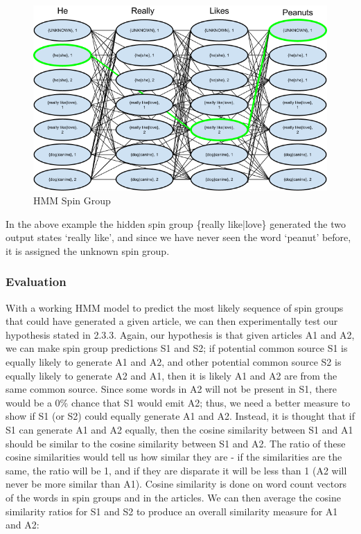 \documentclass[11pt,letterpaper,oneside, titlepage]{scrartcl}
\begin{document}
\begin{figure}[h!]
  \centering
  \includegraphics[width=1\textwidth]{hmm_spin_group}
  \caption{HMM Spin Group}
  \label{fig:hmm_spin_group}
\end{figure}

\clearpage

In the above example the hidden spin group \{really like|love\} generated the two output states ‘really like’, and since we have never seen the word ‘peanut’ before, it is assigned the unknown spin group.

\subsubsection{Evaluation}

With a working HMM model to predict the most likely sequence of spin groups that could have generated a given article, we can then experimentally test our hypothesis stated in 2.3.3. Again, our hypothesis is that given articles A1 and A2, we can make spin group predictions S1 and S2; if potential common source S1 is equally likely to generate A1 and A2, and other potential common source S2 is equally likely to generate A2 and A1, then it is likely A1 and A2 are from the same common source. Since some words in A2 will not be present in S1, there would be a 0\% chance that S1 would emit A2; thus, we need a better measure to show if S1 (or S2) could equally generate A1 and A2. Instead, it is thought that if S1 can generate A1 and A2 equally, then the cosine similarity between S1 and A1 should be similar to the cosine similarity between S1 and A2. The ratio of these cosine similarities would tell us how similar they are - if the similarities are the same, the ratio will be 1, and if they are disparate it will be less than 1 (A2 will never be more similar than A1). Cosine similarity is done on word count vectors of the words in spin groups and in the articles. We can then average the cosine similarity ratios for S1 and S2 to produce an overall similarity measure for A1 and A2:
\end{document}
